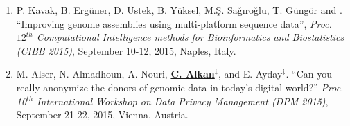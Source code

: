 
\begin{enumerate}

  \item      
    P. Kavak, B. Ergüner, D. Üstek, B. Yüksel, M.Ş. Sağıroğlu, T. Güngör and \calkan{}.
    ``Improving genome assemblies using multi-platform sequence data'',
    {\em Proc. $12^{th}$ Computational Intelligence methods for Bioinformatics and Biostatistics (CIBB 2015)}, 
    September 10-12, 2015, Naples, Italy.
    
  \item        
    M. Alser, N. Almadhoun, A. Nouri, {\bf {\underline{C. Alkan}}}$^\ddag$, and E. Ayday$^\ddag$. 
    ``Can you really anonymize the donors of genomic data in today's digital world?''
    {\em Proc. 10$^{th}$ International Workshop on Data Privacy Management (DPM 2015)}, 
    September 21-22, 2015, Vienna, Austria.

\end{enumerate}
